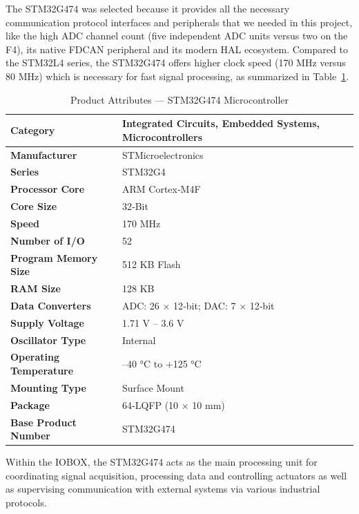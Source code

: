 The STM32G474 was selected because it provides all the necessary communication protocol interfaces and peripherals that we needed in this project, like the high ADC channel count (five independent ADC units versus two on the F4), its native FDCAN peripheral and its modern HAL ecosystem. Compared to the STM32L4 series, the STM32G474 offers higher clock speed (170 MHz versus 80 MHz) which is necessary for fast signal processing, as summarized in Table~\ref{tab:stm32g474_attributes}.
\begin{table}[H]
    \centering
    \caption{Product Attributes — STM32G474 Microcontroller}
    \label{tab:stm32g474_attributes}
    \begin{tabular}{|l|l|}
        \hline
        \textbf{Category} & Integrated Circuits, Embedded Systems, Microcontrollers \\
        \hline
        \textbf{Manufacturer} & STMicroelectronics \\
        \hline
        \textbf{Series} & STM32G4 \\
        \hline
        \textbf{Processor Core} & ARM Cortex‑M4F \\
        \hline
        \textbf{Core Size} & 32‑Bit \\
        \hline
        \textbf{Speed} & 170 MHz \\
        \hline
        \textbf{Number of I/O} & 52 \\
        \hline
        \textbf{Program Memory Size} & 512 KB Flash \\
        \hline
        \textbf{RAM Size} & 128 KB \\
        \hline
        \textbf{Data Converters} & ADC: 26 × 12‑bit; DAC: 7 × 12‑bit \\
        \hline
        \textbf{Supply Voltage} & 1.71 V – 3.6 V \\
        \hline
        \textbf{Oscillator Type} & Internal \\
        \hline
        \textbf{Operating Temperature} & –40 °C to +125 °C \\
        \hline
        \textbf{Mounting Type} & Surface Mount \\
        \hline
        \textbf{Package} & 64‑LQFP (10 × 10 mm) \\
        \hline
        \textbf{Base Product Number} & STM32G474 \\
        \hline
    \end{tabular}
\end{table}

Within the IOBOX, the STM32G474 acts as the main processing unit for coordinating
signal acquisition, processing data and controlling actuators  as well as supervising
communication with external systems via various industrial protocols.    

